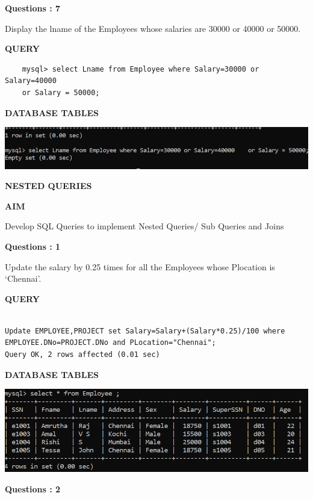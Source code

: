 \documentclass[a4paper,12pt]{report}
\begin{document}
\begin{flushleft}
    \textbf{Questions : 7}
\end{flushleft}
Display the lname of the Employees whose salaries are 30000 or 40000 or 50000.
	\begin{flushleft}
		\textbf{QUERY }
	\end{flushleft}
 \begin{verbatim}
    mysql> select Lname from Employee where Salary=30000 or Salary=40000
    or Salary = 50000; 
 \end{verbatim}
\begin{flushleft}
		\textbf{DATABASE TABLES} 
\end{flushleft} 

\includegraphics[scale=0.5]{Screenshot (469).png}

\newpage
\begin{center}
		\large\textbf{NESTED QUERIES}
	\end{center}
	
	\begin{flushleft}
		\textbf{AIM }
	\end{flushleft} 
	   Develop SQL Queries to implement Nested Queries/ Sub Queries and Joins

\begin{flushleft}
    \textbf{Questions : 1}
\end{flushleft}
Update the salary by 0.25 times for all the Employees whose Plocation is ‘Chennai’.
	\begin{flushleft}
		\textbf{QUERY }
	\end{flushleft}
 \begin{verbatim}
 
Update EMPLOYEE,PROJECT set Salary=Salary+(Salary*0.25)/100 where 
EMPLOYEE.DNo=PROJECT.DNo and PLocation="Chennai";
Query OK, 2 rows affected (0.01 sec)

\end{verbatim}
\begin{flushleft}
		\textbf{DATABASE TABLES} 
\end{flushleft} 

\includegraphics[scale=0.5]{Screenshot (472).png}
\begin{flushleft}
    \textbf{Questions : 2}
\end{flushleft}
\end{document}
